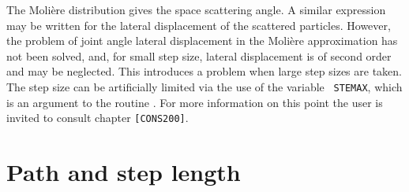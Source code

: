 The Moli\`ere distribution gives the space scattering angle. A similar
expression may be written for the lateral displacement of the
scattered particles. However, the problem of joint angle lateral displacement
in the Moli\`ere approximation has not been solved, and,  for small
step size, lateral displacement is of second order and may be neglected.
This introduces a problem when large step sizes are taken. The step
size can be artificially limited via the use of the variable {\tt
STEMAX}, which is an argument to the routine . For more
information on this point the user is invited to consult chapter
{\tt [CONS200]}.

\section{Path and step length}

